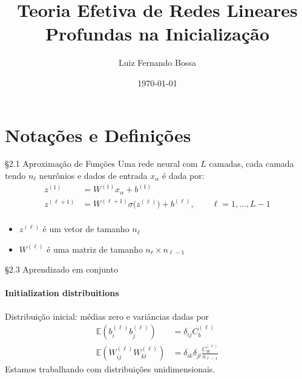 \documentclass{beamer}
\title{Teoria Efetiva de Redes Lineares Profundas na Inicialização}
\author{Luiz Fernando Bossa}
\date{\today}
\institute{Universidade Federal de Santa Catarina}
\newcommand{\EE}{\mathbb{E}}
\begin{document}
{ 
\frame{\titlepage}}
\frame{\tableofcontents}


\section{Notações e Definições}    
\begin{frame}
\tableofcontents[currentsection]
\end{frame}


\begin{frame}{\S 2.1 Aproximação de Funções}
Uma rede neural com $L$ camadas, cada camada tendo $n_\ell$ neurônios e dados de entrada $x_\alpha$ é dada por:
\begin{align*}
	z^{(1)} &= W^{(1)} x_\alpha + b^{(1)}  \\\tag{2.5}\label{eq:NN}
	z^{(\ell+1)} &= W^{(\ell+1)} \sigma\big(z^{(\ell)}\big) + b^{(\ell)}, \qquad \ell = 1, \ldots, L-1 \\
\end{align*}
\begin{itemize}
	\item $z^{(\ell)}$ é um vetor de tamanho $n_\ell$ 
	\item $W^{(\ell)}$ é uma matriz de tamanho $n_\ell \times n_{\ell-1}$
\end{itemize}


\end{frame}
 
\begin{frame}{\S 2.3 Aprendizado em conjunto}
	\framesubtitle{Initialization distribuitions}
	Distribuição inicial: médias zero e variâncias dadas por
	\begin{align*}
		\EE\left(b^{(\ell)}_{i}b^{(\ell)}_j\right) &= \delta_{ij}C_b^{(\ell)}  \tag{2.19}\\
		\EE\left(W^{(\ell)}_{ij}W^{(\ell)}_{kl}\right) &= \delta_{ik}\delta_{jl}\frac{C_W^{(\ell)}}{n_{\ell-1}} \tag{2.20}	
	\end{align*}
	Estamos trabalhando com distribuições unidimensionais.
\end{frame}
\end{document}
